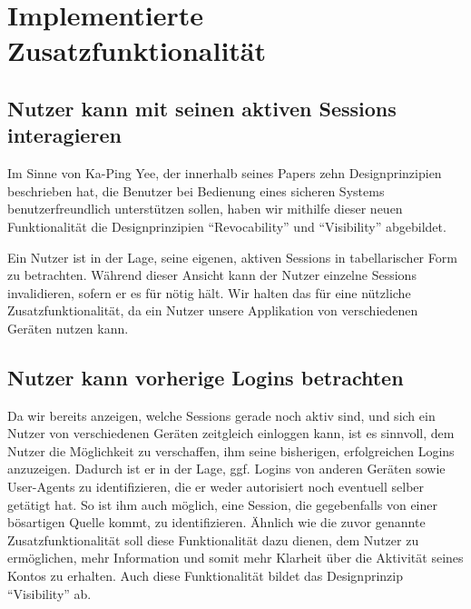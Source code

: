 \documentclass[12pt,DIV14,BCOR10mm,a4paper,parskip=half-,headsepline,headinclude,english,ngerman,bibliography=totocnumbered]{scrreprt}
\begin{document}

\chapter{Implementierte Zusatzfunktionalität}

\section{Nutzer kann mit seinen aktiven Sessions interagieren}

Im Sinne von Ka-Ping Yee, der innerhalb seines Papers  \autocite{Yee.UserInteraction} zehn Designprinzipien beschrieben hat, die Benutzer bei Bedienung eines sicheren Systems benutzerfreundlich unterstützen sollen, haben wir mithilfe dieser neuen Funktionalität die Designprinzipien \enquote{Revocability} und \enquote{Visibility} abgebildet. \par
Ein Nutzer ist in der Lage, seine eigenen, aktiven Sessions in tabellarischer Form zu betrachten.
Während dieser Ansicht kann der Nutzer einzelne Sessions invalidieren, sofern er es für nötig hält.
Wir halten das für eine nützliche Zusatzfunktionalität, da ein Nutzer unsere Applikation von verschiedenen Geräten nutzen kann.

\section{Nutzer kann vorherige Logins betrachten}

Da wir bereits anzeigen, welche Sessions gerade noch aktiv sind, und sich ein Nutzer von verschiedenen Geräten zeitgleich einloggen kann, ist es sinnvoll, dem Nutzer die Möglichkeit zu verschaffen, ihm seine bisherigen, erfolgreichen Logins anzuzeigen.
Dadurch ist er in der Lage, ggf. Logins von anderen Geräten sowie User-Agents zu identifizieren, die er weder autorisiert noch eventuell selber getätigt hat.
So ist ihm auch möglich, eine Session, die gegebenfalls von einer bösartigen Quelle kommt, zu identifizieren.
Ähnlich wie die zuvor genannte Zusatzfunktionalität soll diese Funktionalität dazu dienen, dem Nutzer zu ermöglichen, mehr Information und somit mehr Klarheit über die Aktivität seines Kontos zu erhalten.
Auch diese Funktionalität bildet das Designprinzip \enquote{Visibility} ab.
\end{document}
